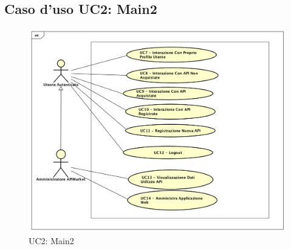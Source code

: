 \newpage
\subsection{Caso d'uso UC2:  Main2 }
\label{UC2}
\begin{figure}[ht]
	\centering
	\includegraphics[scale=0.45]{UML/UC2.png}
	\caption{UC2: Main2}
\end{figure}

